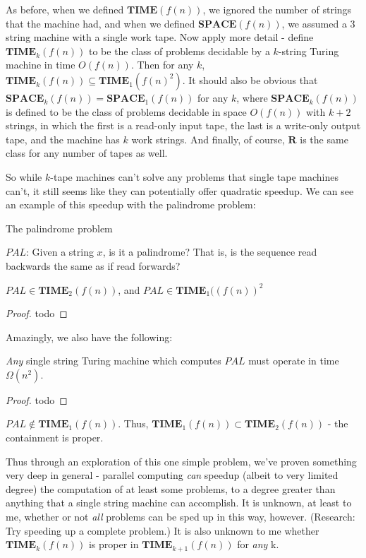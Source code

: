 \begin{corollary}
	As before, when we defined $\bm{TIME}(f(n))$, we ignored the number of strings that the machine had, and when we defined $\bm{SPACE}(f(n))$, we assumed a 3 string machine with a single work tape. Now apply more detail - define $\bm{TIME}_k(f(n))$ to be the class of problems decidable by a $k$-string Turing machine in time $O(f(n))$. Then for any $k$, $\bm{TIME}_k(f(n)) \subseteq \bm{TIME}_1(f(n)^2)$. It should also be obvious that $\bm{SPACE}_k(f(n)) = \bm{SPACE}_1(f(n))$ for any $k$, where $\bm{SPACE}_k(f(n))$ is defined to be the class of problems decidable in space $O(f(n))$ with $k+2$ strings, in which the first is a read-only input tape, the last is a write-only output tape, and the machine has $k$ work strings. And finally, of course, $\bm{R}$ is the same class for any number of tapes as well.
\end{corollary}
So while $k$-tape machines can't solve any problems that single tape machines can't, it still seems like they can potentially offer quadratic speedup. We can see an example of this speedup with the palindrome problem:
\begin{problem}
	The palindrome problem
	\begin{center}
		$PAL$: Given a string $x$, is it a palindrome? That is, is the sequence read backwards the same as if read forwards?
	\end{center}
\end{problem}
\begin{fact}
	$PAL \in \bm{TIME}_2(f(n))$, and $PAL \in \bm{TIME}_1((f(n))^2$
\end{fact}
\begin{proof}
	todo
\end{proof}
Amazingly, we also have the following:
\begin{theorem}
	\textit{Any} single string Turing machine which computes $PAL$ must operate in time $\Omega(n^2)$. 
\end{theorem}
\begin{proof}
	todo
\end{proof}
\begin{corollary}
	$PAL \notin \bm{TIME}_1(f(n))$. Thus, $\bm{TIME}_1(f(n)) \subset \bm{TIME}_2(f(n))$ - the containment is proper.
\end{corollary}
Thus through an exploration of this one simple problem, we've proven something very deep in general - parallel computing \textit{can} speedup (albeit to very limited degree) the computation of at least some problems, to a degree greater than anything that a single string machine can accomplish. It is unknown, at least to me, whether or not \textit{all} problems can be sped up in this way, however. (Research: Try speeding up a complete problem.) It is also unknown to me whether $\bm{TIME}_k(f(n))$ is proper in $\bm{TIME}_{k+1}(f(n))$ for \textit{any} k. 

